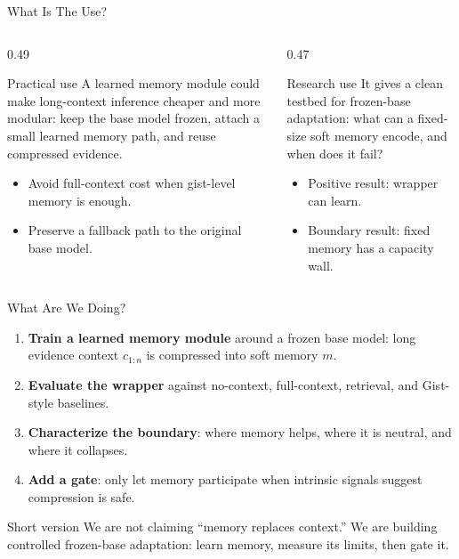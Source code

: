 \begin{frame}{What Is The Use?}
  \begin{columns}[T]
    \begin{column}{0.49\textwidth}
      \begin{block}{Practical use}
        A learned memory module could make long-context inference cheaper and more modular:
        keep the base model frozen, attach a small learned memory path, and reuse
        compressed evidence.
      \end{block}
      \begin{itemize}
        \item Avoid full-context cost when gist-level memory is enough.
        \item Preserve a fallback path to the original base model.
      \end{itemize}
    \end{column}
    \begin{column}{0.47\textwidth}
      \begin{block}{Research use}
        It gives a clean testbed for frozen-base adaptation: what can a fixed-size
        soft memory encode, and when does it fail?
      \end{block}
      \begin{itemize}
        \item Positive result: wrapper can learn.
        \item Boundary result: fixed memory has a capacity wall.
      \end{itemize}
    \end{column}
  \end{columns}
\end{frame}

\begin{frame}{What Are We Doing?}
  \small
  \begin{enumerate}
    \item \textbf{Train a learned memory module} around a frozen base model: long evidence
      context $c_{1:n}$ is compressed into soft memory $m$.
    \item \textbf{Evaluate the wrapper} against no-context, full-context,
      retrieval, and Gist-style baselines.
    \item \textbf{Characterize the boundary}: where memory helps, where it is
      neutral, and where it collapses.
    \item \textbf{Add a gate}: only let memory participate when intrinsic signals
      suggest compression is safe.
  \end{enumerate}
  \vspace{0.5em}
  \begin{block}{Short version}
    We are not claiming ``memory replaces context.'' We are building controlled
    frozen-base adaptation: learn memory, measure its limits, then gate it.
  \end{block}
\end{frame}

